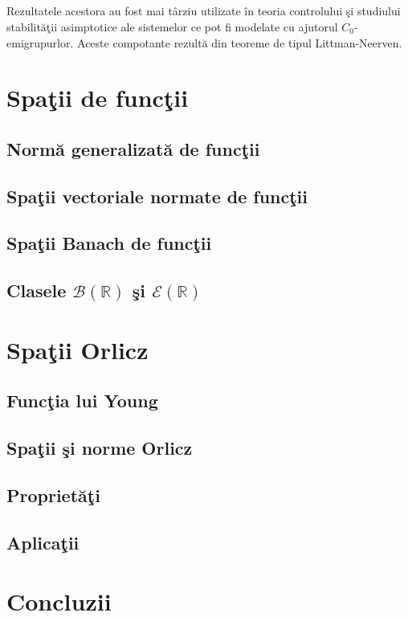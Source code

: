 \documentclass[12pt]{report}
\begin{document}
\paragraph{}
Rezultatele acestora au fost mai t\^ arziu utilizate \^ in teoria controlului \c si studiului stabilit\u a\c tii asimptotice ale sistemelor ce pot fi modelate cu ajutorul ${C_0}$-emigrupurlor. Aceste compotante rezult\u a din teoreme de tipul Littman-Neerven.

\chapter{Spa\c tii de func\c tii}
\section{Norm\u a generalizat\u a de func\c tii}
\section{Spa\c tii vectoriale normate de func\c tii}
\section{Spa\c tii Banach de func\c tii}
\section{Clasele $\mathcal{B}(\mathbb{R})$ \c si $\mathcal{E}(\mathbb{R})$}
\chapter{Spa\c tii Orlicz}
\section{Func\c tia lui Young}
\section{Spa\c tii \c si norme Orlicz}
\section{Propriet\u a\c ti}
\section{Aplica\c tii}
\chapter{Concluzii}
\end{document}
